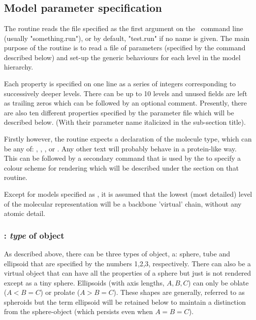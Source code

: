 \section{}

\subsection{Model parameter specification}

The  routine reads the file specified as the first argument on the \NAME\ command
line (usually "something.run"), or by default, "test.run" if no name is given.  The main
purpose of the  routine is to read a file of parameters (specified by the
 command described below) and set-up the generic behaviours for each level in
the model hierarchy.

Each property is specified
on one line as a series of integers corresponding to successively deeper levels.  There
can be up to 10 levels and unused fields are left as trailing zeros which can be followed
by an optional comment.   Presently, there are also ten different properties specified
by the parameter file which will be described below.  (With their parameter name italicized
in the sub-section title).

Firstly however, the routine expects a
declaration of the molecule type, which can be any of: , , ,
 or .  Any other text will probably behave in a protein-like way.
This can be followed by a secondary command that is used by the  to specify
a colour scheme for rendering which will be described under the section on that routine.

Except for models specified as , 
it is assumed that the lowest (most detailed) level of the molecular representation will
be a backbone 'virtual' chain, without any atomic detail.  

\subsubsection{: {\em type} of object}

As described above, there can be three types of object, a: sphere, tube and ellipsoid that
are specified by the numbers 1,2,3, respectively.   There can also be a virtual object that
can have all the properties of a sphere but just is not rendered except as a tiny sphere.
Ellipsoids (with axis lengths, $A,B,C$) can only be oblate ($A<B=C$) or prolate ($A>B=C$).
These shapes are generally, referred to as spheroids but the term ellipsoid will be retained
below to maintain a distinction from the sphere-object (which persists even when $A=B=C$).


